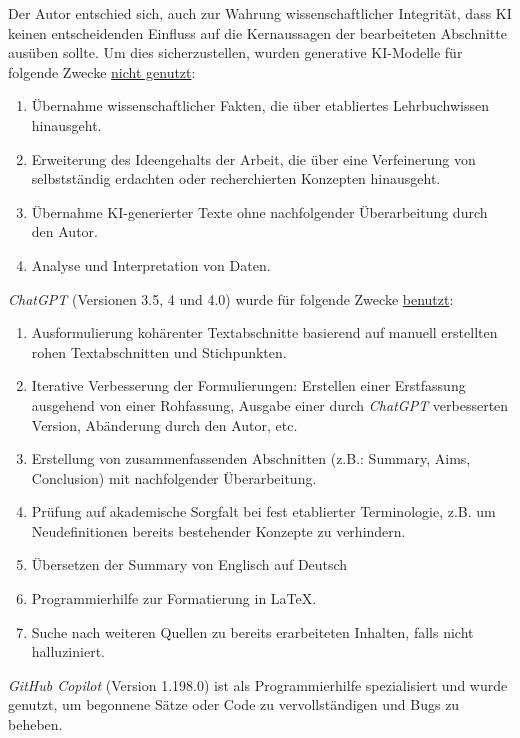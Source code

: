 \noindent Der Autor entschied sich, auch zur Wahrung wissenschaftlicher Integrität, dass
KI keinen entscheidenden Einfluss auf die Kernaussagen der bearbeiteten
Abschnitte ausüben sollte. Um dies sicherzustellen, wurden generative KI-Modelle
für folgende Zwecke \underline{nicht genutzt}:
\begin{enumerate}
    \item Übernahme wissenschaftlicher Fakten, die über etabliertes Lehrbuchwissen hinausgeht.
    \item Erweiterung des Ideengehalts der Arbeit, die über eine Verfeinerung
          von selbstständig erdachten oder recherchierten Konzepten hinausgeht.
    \item Übernahme KI-generierter Texte ohne nachfolgender Überarbeitung durch den Autor.
    \item Analyse und Interpretation von Daten.
\end{enumerate}

\noindent \textit{ChatGPT} (Versionen 3.5, 4 und 4.0) wurde für folgende Zwecke \underline{benutzt}:
\begin{enumerate}
    \item Ausformulierung kohärenter Textabschnitte basierend auf manuell
          erstellten rohen Textabschnitten und Stichpunkten.
    \item Iterative Verbesserung der Formulierungen: Erstellen einer Erstfassung
          ausgehend von einer Rohfassung, Ausgabe einer durch \textit{ChatGPT} verbesserten
          Version, Abänderung durch den Autor, etc.
    \item Erstellung von zusammenfassenden Abschnitten (z.B.: Summary, Aims,
          Conclusion) mit nachfolgender Überarbeitung.
    \item Prüfung auf akademische Sorgfalt bei fest etablierter Terminologie,
          z.B. um Neudefinitionen bereits bestehender Konzepte zu verhindern.
    \item Übersetzen der Summary von Englisch auf Deutsch
    \item Programmierhilfe zur Formatierung in LaTeX.
    \item Suche nach weiteren Quellen zu bereits erarbeiteten Inhalten, falls nicht halluziniert.
\end{enumerate}

\noindent \textit{GitHub Copilot} (Version 1.198.0) ist als Programmierhilfe
spezialisiert und wurde genutzt, um begonnene Sätze oder Code zu
vervollständigen und Bugs zu beheben.

